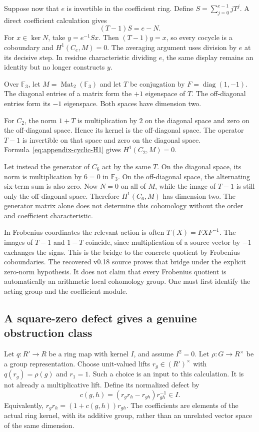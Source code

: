 Suppose now that $e$ is invertible in the coefficient ring. Define
$S=\sum_{j=0}^{e-1}jT^j$. A direct coefficient calculation gives
\[
 (T-1)S=e-N.
\]
For $x\in\ker N$, take $y=e^{-1}Sx$. Then $(T-1)y=x$, so every cocycle is
a coboundary and $H^1(C_e,M)=0$. The averaging argument uses division by
$e$ at its decisive step. In residue characteristic dividing $e$, the same
display remains an identity but no longer constructs $y$.

\begin{example}
Over $\mathbb F_3$, let $M=\operatorname{Mat}_2(\mathbb F_3)$ and let $T$
be conjugation by $F=\operatorname{diag}(1,-1)$. The diagonal entries of a
matrix form the $+1$ eigenspace of $T$. The off-diagonal entries form its
$-1$ eigenspace. Both spaces have dimension two.

For $C_2$, the norm $1+T$ is multiplication by $2$ on the diagonal space and
zero on the off-diagonal space. Hence its kernel is the off-diagonal space.
The operator $T-1$ is invertible on that space and zero on the diagonal
space. Formula~\eqref{eq:appendix-cyclic-H1} gives $H^1(C_2,M)=0$.

Let instead the generator of $C_6$ act by the same $T$. On the diagonal
space, its norm is multiplication by $6=0$ in $\mathbb F_3$. On the
off-diagonal space, the alternating six-term sum is also zero. Now $N=0$
on all of $M$, while the image of $T-1$ is still only the off-diagonal
space. Therefore $H^1(C_6,M)$ has dimension two. The generator matrix
alone does not determine this cohomology without the order and coefficient
characteristic.
\end{example}

In Frobenius coordinates the relevant action is often $T(X)=FXF^{-1}$.
The images of $T-1$ and $1-T$ coincide, since multiplication of a source
vector by $-1$ exchanges the signs. This is the bridge to the concrete
quotient by Frobenius coboundaries. The recovered v0.18 source proves that
bridge under the explicit zero-norm hypothesis. It does not claim that every
Frobenius quotient is automatically an arithmetic local cohomology group.
One must first identify the acting group and the coefficient module.

\subsection{A square-zero defect gives a genuine obstruction class}

Let $q:R'\to R$ be a ring map with kernel $I$, and assume $I^2=0$. Let
$\rho:G\to R^\times$ be a group representation. Choose unit-valued lifts
$r_g\in (R')^\times$ with $q(r_g)=\rho(g)$ and $r_1=1$. Such a choice is
an input to this calculation. It is not already a multiplicative lift.
Define its normalized defect by
\begin{equation}
 c(g,h)=(r_gr_h-r_{gh})r_{gh}^{-1}\in I.
 \label{eq:appendix-normalized-defect}
\end{equation}
Equivalently, $r_gr_h=(1+c(g,h))r_{gh}$. The coefficients are elements of
the actual ring kernel, with its additive group, rather than an unrelated
vector space of the same dimension.


